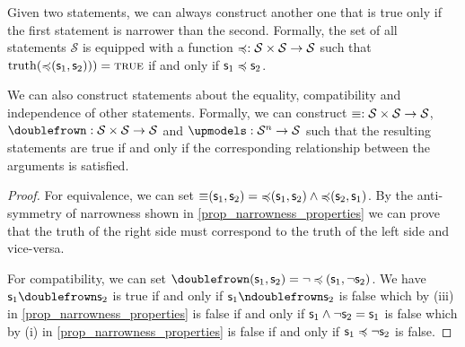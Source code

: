 \documentclass[11pt,letterpaper,fleqn]{memoir} %
\begin{document}
\begin{mathSection}
	\begin{axiom}\label{def_implication_of_statement}
	Given two statements, we can always construct another one that is true only if the first statement is narrower than the second. Formally, the set of all statements $\mathcal{S}$ is equipped with a function $\preccurlyeq : \mathcal{S} \times \mathcal{S} \to \mathcal{S}$ such that $\operatorname{truth}(\mathbin{\preccurlyeq}(\mathsf{s}_1, \mathsf{s}_2))) = \textsc{true}$ if and only if $\mathsf{s}_1 \preccurlyeq \mathsf{s}_2$.
	\end{axiom}
	\begin{prop}
		We can also construct statements about the equality, compatibility and independence of other statements. Formally, we can construct  $\equiv : \mathcal{S} \times \mathcal{S} \to \mathcal{S}$, $\comp : \stmtSet \times \stmtSet \to \stmtSet$ and  $\indep : \stmtSet^n \to \stmtSet$ such that the resulting statements are true if and only if the corresponding relationship between the arguments is satisfied.
	\end{prop}
	\begin{proof}
		For equivalence, we can set $\mathbin{\equiv}(\mathsf{s}_1, \mathsf{s}_2) = \mathbin{\preccurlyeq}(\mathsf{s}_1, \mathsf{s}_2) \wedge \mathbin{\preccurlyeq}(\mathsf{s}_2, \mathsf{s}_1)$. By the anti-symmetry of narrowness shown in \ref{prop_narrowness_properties} we can prove that the truth of the right side must correspond to the truth of the left side and vice-versa.
		
		For compatibility, we can set $\mathbin{\comp}(\stmt_1, \stmt_2) = \NOT \mathbin{\narrower}(\stmt_1, \NOT \stmt_2)$. We have $\stmt_1 \comp \stmt_2$ is true if and only if $\stmt_1 \ncomp \stmt_2$ is false which by (iii) in \ref{prop_narrowness_properties} is false if and only if $\mathsf{s}_1\wedge \neg \mathsf{s}_2 = \mathsf{s}_1$ is false which by (i) in \ref{prop_narrowness_properties} is false if and only if $\mathsf{s}_1 \preccurlyeq \neg \mathsf{s}_2$ is false.
		

\end{proof}
\end{mathSection}
\end{document}
